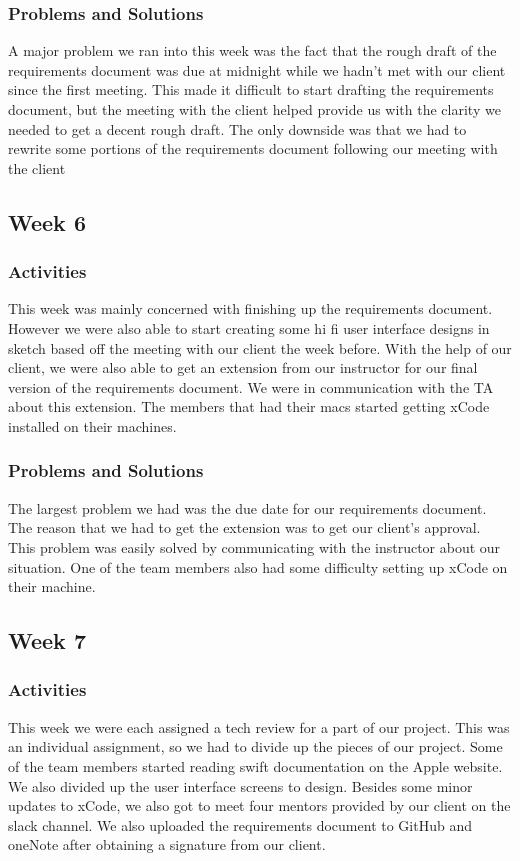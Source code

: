 \documentclass[onecolumn, draftclsnofoot,10pt, compsoc]{IEEEtran}
\begin{document}
\subsubsection{Problems and Solutions}
A major problem we ran into this week was the fact that the rough draft of the requirements document was due at midnight while we hadn’t met with our client since the first meeting. This made it difficult to start drafting the requirements document, but the meeting with the client helped provide us with the clarity we needed to get a decent rough draft. The only downside was that we had to rewrite some portions of the requirements document following our meeting with the client
\subsection{Week 6}
\subsubsection{Activities}
This week was mainly concerned with finishing up the requirements document. However we were also able to start creating some hi fi user interface designs in sketch based off the meeting with our client the week before. With the help of our client, we were also able to get an extension from our instructor for our final version of the requirements document. We were in communication with the TA about this extension. The members that had their macs started getting xCode installed on their machines.

\subsubsection{Problems and Solutions}
The largest problem we had was the due date for our requirements document. The reason that we had to get the extension was to get our client’s approval. This problem was easily solved by communicating with the instructor about our situation. One of the team members also had some difficulty setting up xCode on their machine.
\subsection{Week 7}
\subsubsection{Activities}
This week we were each assigned a tech review for a part of our project. This was an individual assignment, so we had to divide up the pieces of our project. Some of the team members started reading swift documentation on the Apple website. We also divided up the user interface screens to design. Besides some minor updates to xCode, we also got to meet four mentors provided by our client on the slack channel. We also uploaded the requirements document to GitHub and oneNote after obtaining a signature from our client.
\end{document}

